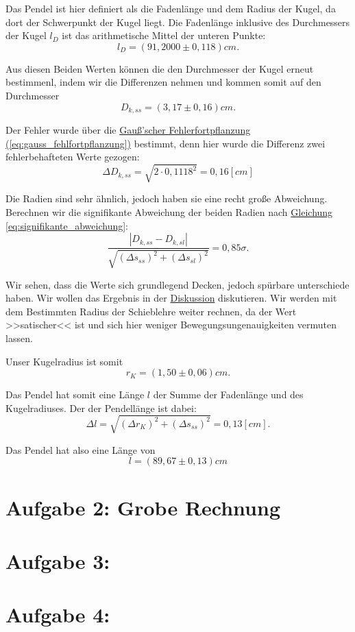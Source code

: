 Das Pendel ist hier definiert als die Fadenlänge und dem Radius der Kugel, da dort der Schwerpunkt der Kugel liegt. Die Fadenlänge inklusive des Durchmessers der Kugel $l_D$ ist das arithmetische Mittel der unteren Punkte:
\begin{equation}
    l_D = (91,2000 \pm 0,118) cm.
\end{equation}

Aus diesen Beiden Werten können die den Durchmesser der Kugel erneut bestimmenl, indem wir die Differenzen nehmen und kommen somit auf den Durchmesser
\begin{equation}
    D_{k,ss} = (3,17 \pm 0,16)cm.
\end{equation}

Der Fehler wurde über die \hyperref[eq:gauss_fehlfortpflanzung]{Gauß'scher Fehlerfortpflanzung (\ref*{eq:gauss_fehlfortpflanzung})} bestimmt, denn hier wurde die Differenz zwei fehlerbehafteten Werte gezogen:
\begin{equation}
    \Delta D_{k,ss} = \sqrt{2 \cdot 0,1118^2} = 0,16 [cm]
\end{equation}

Die Radien sind sehr ähnlich, jedoch haben sie eine recht große Abweichung. Berechnen wir die signifikante Abweichung der beiden Radien nach \hyperref[eq:signifikante_abweichung]{Gleichung \ref*{eq:signifikante_abweichung}}:
\begin{equation}
    \frac{\left| D_{k,ss} - D_{k,sl} \right|}{\sqrt{(\Delta s_{ss})^2 + (\Delta s_{sl})^2 }} = 0,85\sigma.
\end{equation}

Wir sehen, dass die Werte sich grundlegend Decken, jedoch spürbare unterschiede haben. Wir wollen das Ergebnis in der \hyperref[ch:diskussion]{Diskussion} diskutieren. Wir werden mit dem Bestimmten Radius der Schieblehre weiter rechnen, da der Wert >>satischer<< ist und sich hier weniger Bewegungsungenauigkeiten vermuten lassen.

Unser Kugelradius ist somit 
\begin{equation}
    \boxed{
        r_K = (1,50 \pm 0,06)cm.
    }
\end{equation}

Das Pendel hat somit eine Länge $l$ der Summe der Fadenlänge und des Kugelradiuses. Der der Pendellänge ist dabei:
\begin{equation}
    \Delta l = \sqrt{(\Delta r_K)^2 + (\Delta s_{ss})^2} = 0,13 [cm].
\end{equation} 

Das Pendel hat also eine Länge von
\begin{equation}
\boxed{
    l = (89,67 \pm 0,13)cm
}
\end{equation}


\section{Aufgabe 2: Grobe Rechnung}

\section{Aufgabe 3: }

\section{Aufgabe 4: }